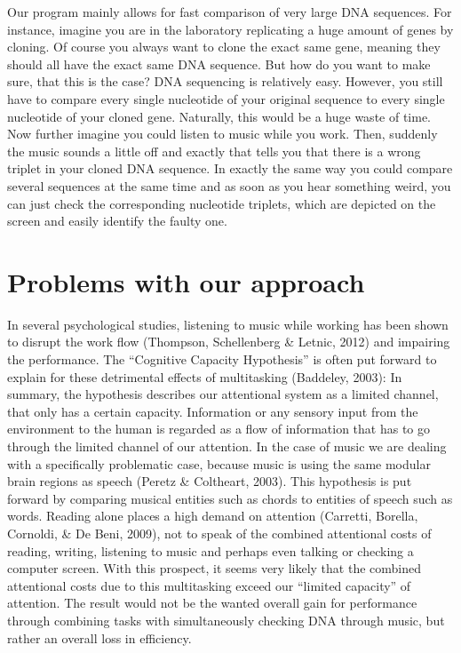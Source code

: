 \documentclass[12pt]{article}
\begin{document}
Our program mainly allows for fast comparison of very large DNA sequences. For instance, imagine you are in the laboratory replicating a huge amount of genes by cloning. Of course you always want to clone the exact same gene, meaning they should all have the exact same DNA sequence. But how do you want to make sure, that this is the case?
DNA sequencing is relatively easy. However, you still have to compare every single nucleotide of your original sequence to every single nucleotide of your cloned gene. Naturally, this would be a huge waste of time.
Now further imagine you could listen to music while you work. Then, suddenly the music sounds a little off and exactly that tells you that there is a wrong triplet in your cloned DNA sequence. In exactly the same way you could compare several sequences at the same time and as soon as you hear something weird, you can just check the corresponding nucleotide triplets, which are depicted on the screen and easily identify the faulty one. 

\section{Problems with our approach}
In several psychological studies, listening to music while working has been shown to disrupt the work flow (Thompson, Schellenberg \& Letnic, 2012) and impairing the performance. The “Cognitive Capacity Hypothesis” is often put forward to explain for these detrimental effects of multitasking (Baddeley, 2003): In summary, the hypothesis describes our attentional system as a limited channel, that only has a certain capacity. Information or any sensory input from the environment to the human is regarded as a flow of information that has to go through the limited channel of our attention. In the case of music we are dealing with a specifically problematic case, because music is using the same modular brain regions as speech (Peretz \& Coltheart, 2003). This hypothesis is put forward by comparing musical entities such as chords to entities of speech such as words. Reading alone places a high demand on attention (Carretti, Borella, Cornoldi, \& De Beni, 2009), not to speak of the combined attentional costs of reading, writing, listening to music and perhaps even talking or checking a computer screen. With this prospect, it seems very likely that the combined attentional costs due to this multitasking exceed our “limited capacity” of attention. The result would not be the wanted overall gain for performance through combining tasks with simultaneously checking DNA through music, but rather an overall loss in efficiency.
\end{document}
